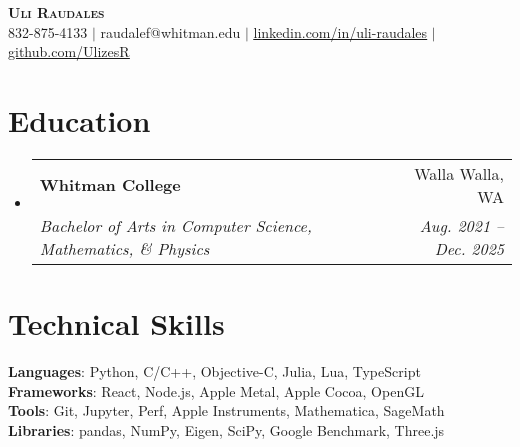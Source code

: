 \documentclass[letterpaper,11pt]{article}
\makeatletter
\newcommand{\resumeSubheading}[4]{
  \vspace{-2pt}\item
    \begin{tabular*}{0.97\textwidth}[t]{l@{\extracolsep{\fill}}r}
      \textbf{#1} & #2 \\
      \textit{\small#3} & \textit{\small #4} \\
    \end{tabular*}\vspace{-7pt}
}
\newcommand{\resumeSubHeadingListStart}{\begin{itemize}[leftmargin=0.15in, label={}]}
\newcommand{\resumeSubHeadingListEnd}{\end{itemize}}
\makeatother
\begin{document}
\begin{center}
    \textbf{\Huge \scshape Uli Raudales} \\ \vspace{1pt}
    \small 832-875-4133 $|$ raudalef@whitman.edu $|$ 
    \href{https://linkedin.com/in/uli-raudales-3120b629a/}{\underline{linkedin.com/in/uli-raudales}} $|$
    \href{https://github.com/UlizesR}{\underline{github.com/UlizesR}}
\end{center}

\section{Education}
  \resumeSubHeadingListStart
    \resumeSubheading
      {Whitman College}{Walla Walla, WA}
      {Bachelor of Arts in Computer Science, Mathematics, \& Physics}{Aug. 2021 -- Dec. 2025}
  \resumeSubHeadingListEnd

\section{Technical Skills}
 \begin{itemize}[leftmargin=0.15in, label={}]
    \small{\item{
     \textbf{Languages}{: Python, C/C++, Objective-C, Julia, Lua, TypeScript} \\
     \textbf{Frameworks}{: React, Node.js, Apple Metal, Apple Cocoa, OpenGL} \\
     \textbf{Tools}{: Git, Jupyter, Perf, Apple Instruments, Mathematica, SageMath} \\
     \textbf{Libraries}{: pandas, NumPy, Eigen, SciPy, Google Benchmark, Three.js} \\
    }}
 \end{itemize}

\end{document}
